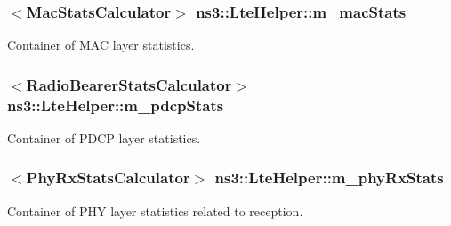 \subsubsection[{\texorpdfstring{m\+\_\+mac\+Stats}{m_macStats}}]{$<${\bf Mac\+Stats\+Calculator}$>$ ns3\+::\+Lte\+Helper\+::m\+\_\+mac\+Stats\hspace{0.3cm}{\ttfamily [private]}}\hypertarget{classns3_1_1LteHelper_a4b5eb57c346e6876a53d5c79f629513a}{}\label{classns3_1_1LteHelper_a4b5eb57c346e6876a53d5c79f629513a}


Container of M\+AC layer statistics. 

\subsubsection[{\texorpdfstring{m\+\_\+pdcp\+Stats}{m_pdcpStats}}]{$<${\bf Radio\+Bearer\+Stats\+Calculator}$>$ ns3\+::\+Lte\+Helper\+::m\+\_\+pdcp\+Stats\hspace{0.3cm}{\ttfamily [private]}}\hypertarget{classns3_1_1LteHelper_ab69bc074f3e3e4c80fcfb3afcb708ffa}{}\label{classns3_1_1LteHelper_ab69bc074f3e3e4c80fcfb3afcb708ffa}


Container of P\+D\+CP layer statistics. 

\subsubsection[{\texorpdfstring{m\+\_\+phy\+Rx\+Stats}{m_phyRxStats}}]{$<${\bf Phy\+Rx\+Stats\+Calculator}$>$ ns3\+::\+Lte\+Helper\+::m\+\_\+phy\+Rx\+Stats\hspace{0.3cm}{\ttfamily [private]}}\hypertarget{classns3_1_1LteHelper_a836b5bbfbc6a350d578833309f237854}{}\label{classns3_1_1LteHelper_a836b5bbfbc6a350d578833309f237854}


Container of P\+HY layer statistics related to reception. 

